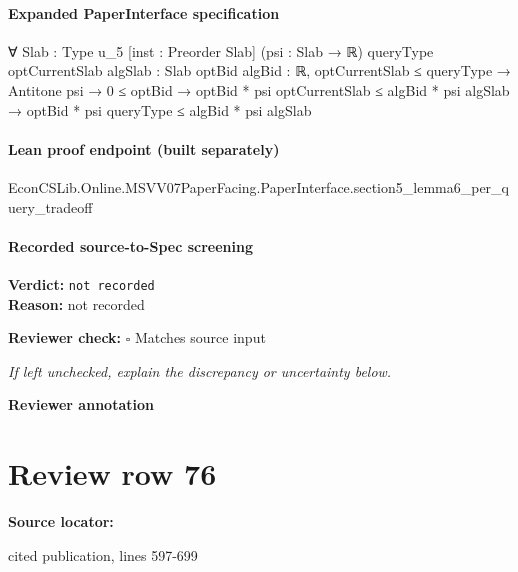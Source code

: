 \documentclass[10pt]{article}
\newcommand{\reviewerbox}{%
  \par\noindent\fbox{\parbox{0.96\linewidth}{\rule{0pt}{0.38in}}}\par
}
\newcommand{\reviewmatch}[1]{%
  \par\noindent\textbf{Reviewer check:} $\square$\; #1\par
  \noindent\emph{If left unchecked, explain the discrepancy or uncertainty below.}\par
}
\begin{document}
\paragraph{Expanded PaperInterface specification}
\begin{ReviewVerbatim}
∀ {Slab : Type u_5} [inst : Preorder Slab] (psi : Slab → ℝ) {queryType optCurrentSlab algSlab : Slab}
  {optBid algBid : ℝ},
  optCurrentSlab ≤ queryType →
    Antitone psi →
      0 ≤ optBid → optBid * psi optCurrentSlab ≤ algBid * psi algSlab → optBid * psi queryType ≤ algBid * psi algSlab
\end{ReviewVerbatim}

\paragraph{Lean proof endpoint (built separately)}\begin{ReviewVerbatim}
EconCSLib.Online.MSVV07PaperFacing.PaperInterface.section5_lemma6_per_query_tradeoff
\end{ReviewVerbatim}

\paragraph{Recorded source-to-Spec screening}
\textbf{Verdict:} \texttt{not recorded}
\\
\textbf{Reason:} not recorded
\reviewmatch{Matches source input}
\noindent\textbf{Reviewer annotation}\par
\reviewerbox
\clearpage
\hypertarget{source-claim-74c3a38219d4d660}{}
\section*{Review row 76}
\textbf{Source locator:} {\footnotesize\raggedright cited publication, lines 597-\allowbreak{}699\par}
\end{document}
